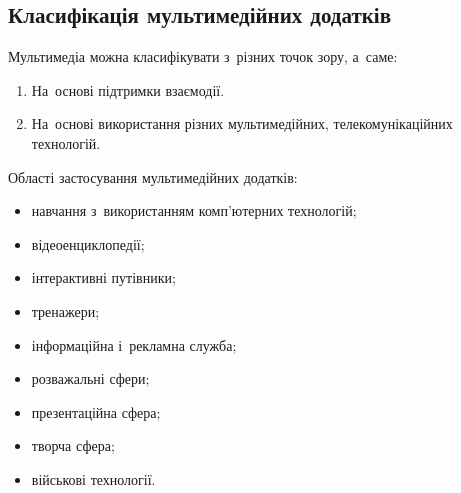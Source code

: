 \documentclass[
	a4paper,
	oneside,
	BCOR = 10mm,
	DIV = 12,
	12pt,
	headings = normal,
]{scrartcl}
\begin{document}
		\subsection{Класифікація мультимедійних додатків}
			Мультимедіа можна класифікувати з~різних точок зору, а~саме:
			\begin{enumerate}[noitemsep]
				\item На~основі підтримки взаємодії.
				\item На~основі використання різних мультимедійних, телекомунікаційних технологій.
			\end{enumerate}
			Області застосування мультимедійних додатків:
			\begin{itemize}[noitemsep]
				\item навчання з~використанням комп'ютерних технологій;
				\item відеоенциклопедії;
				\item інтерактивні путівники;
				\item тренажери;
				\item інформаційна і~рекламна служба;
				\item розважальні сфери;
				\item презентаційна сфера;
				\item творча сфера;
				\item військові технології.
			\end{itemize}
\end{document}
